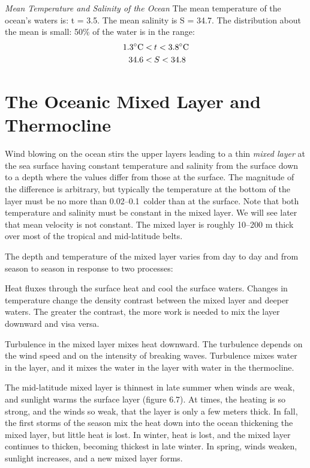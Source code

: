 \textit{Mean Temperature and Salinity of the Ocean} The mean
temperature of the ocean's waters is: t = 3.5. The mean
salinity is S = 34.7. The distribution about the mean is small: 50\%
of the water is in the range:
\begin{align}
1.3^{\circ}\text{C} < &\:t < 3.8^{\circ}\text{C} \notag \\
34.6 < &\:S < 34.8 \notag
\end{align}

\section{The Oceanic Mixed Layer and Thermocline}
Wind blowing on the ocean stirs the upper layers leading to a thin
\textit{mixed layer} at the sea surface
having constant temperature and salinity from the surface down to a
depth where the values differ from those at the surface. The magnitude
of the difference is arbitrary, but typically the temperature at the
bottom of the layer must be no more than 0.02--0.1\degrees\ colder
than at the surface. Note that both temperature and salinity must be
constant in the mixed layer. We will see later that mean velocity is
not constant. The mixed layer is roughly 10--200 m thick over most of
the tropical and mid-latitude belts.

The depth and temperature of the mixed layer varies from day to day and from season to
season in response to two processes:
\begin{enumerate}
\vitem Heat fluxes through the surface heat and cool the surface
waters. Changes in temperature change the density contrast between the
mixed layer and deeper waters. The greater the contrast, the more work
is needed to mix the layer downward and visa versa.

\vitem Turbulence in the mixed layer mixes heat downward. The
turbulence depends on the wind speed
and on the intensity of breaking waves. Turbulence mixes water in the
layer, and it mixes the water in the layer with water in the
thermocline.
\end{enumerate}

The mid-latitude mixed layer is
thinnest in late summer when winds are weak, and sunlight warms the
surface layer (figure 6.7). At times, the heating is so strong, and
the winds so weak, that the layer is only a few meters thick. In fall,
the first storms of the season mix the heat down into the ocean
thickening the mixed layer, but little heat is lost. In winter, heat
is lost, and the mixed layer continues to thicken, becoming thickest
in late winter. In spring, winds weaken, sunlight increases, and a new
mixed layer forms.

